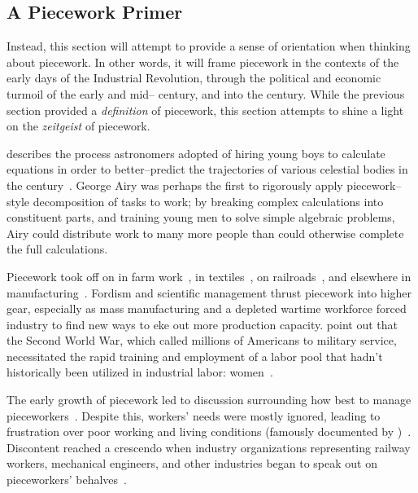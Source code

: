 \documentclass[trackingWork]{subfiles}
\begin{document}
\subsection{A Piecework Primer}\label{sec:pieceworkPrimer} %
Instead, this section will attempt to provide a sense of orientation when thinking about piecework.
In other words, it will frame piecework in the contexts of
the early days of the Industrial Revolution,
through the political and economic turmoil of the early and mid-- century,
and into the  century.
While the previous section provided a \textit{definition} of piecework,
this section attempts to shine a light on the \textit{zeitgeist} of piecework.


\citeauthor{grier2013computers} describes the process astronomers adopted of hiring young boys
to calculate equations in order
to better--predict the trajectories of various celestial bodies in the  century~\cite{grier2013computers}.
George Airy was perhaps the first to rigorously apply piecework--style decomposition of tasks to work;
by breaking complex calculations into constituent parts, and
training young men to solve simple algebraic problems,
Airy could distribute work to many more people than could otherwise complete the full calculations.


Piecework took off on in farm work~\cite{hughRaynbirdTaskWork},
in textiles~\cite{restructuringPieceworkBaker,riisOtherSideLives},
on railroads~\cite{Brown01041990}, and 
elsewhere in manufacturing~\cite{10.2307/3827491}.
Fordism and scientific management thrust piecework into higher gear, especially as
mass manufacturing and
a depleted wartime workforce forced industry to find new ways to eke out more production capacity.
\citeauthor{hart2013rise} point out that the Second World War,
which called millions of Americans to military service,
necessitated the rapid training and employment of
a labor pool that hadn't historically been utilized in industrial labor: women~\cite{hart2013rise}.

The early growth of piecework led to discussion surrounding how best to manage pieceworkers~\cite{norton1900textile,clark1908cotton}.
Despite this, workers' needs were mostly ignored,
leading to frustration over poor working and living conditions
(famously documented by
\citeauthor{riisOtherSideLives})~\cite{riisOtherSideLives}.
Discontent reached a crescendo when industry organizations representing
railway workers, mechanical engineers, and other industries began to speak out on pieceworkers' behalves~\cite{american1921problem,richards1904anything}.
\end{document}
